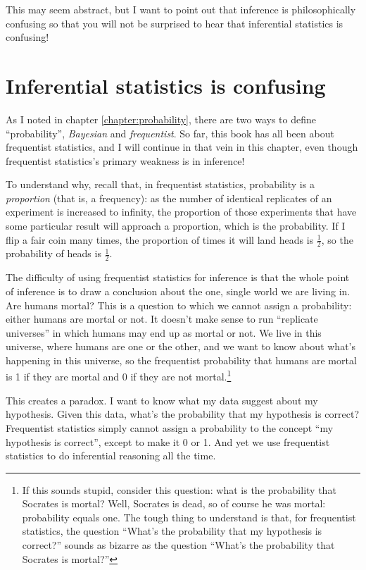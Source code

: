 This may seem abstract, but I want to point out that inference is philosophically confusing so that you will not be surprised to hear that inferential statistics is confusing!

\section{Inferential statistics is confusing}

As I noted in chapter \ref{chapter:probability}, there are two ways to define
``probability'', \emph{Bayesian} and \emph{frequentist}. So far, this book has
all been about frequentist statistics, and I will continue in that vein in this
chapter, even though frequentist statistics's primary weakness is in inference!

To understand why, recall that, in frequentist statistics, probability is
a \emph{proportion} (that is, a frequency): as the number of identical
replicates of an experiment is increased to infinity, the proportion of those
experiments that have some particular result will approach a proportion, which
is the probability. If I flip a fair coin many times, the proportion of times
it will land heads is $\tfrac{1}{2}$, so the probability of heads is
$\tfrac{1}{2}$.

The difficulty of using frequentist statistics for inference is that the whole
point of inference is to draw a conclusion about the one, single world we are
living in. Are humans mortal? This is a question to which we cannot assign
a probability: either humans are mortal or not. It doesn't make sense to run
``replicate universes'' in which humans may end up as mortal or not. We live in
this universe, where humans are one or the other, and we want to know about
what's happening in this universe, so the frequentist probability that humans
are mortal is 1 if they are mortal and 0 if they are not mortal.\footnote{If
this sounds stupid, consider this question: what is the probability that
Socrates is mortal? Well, Socrates is dead, so of course he was mortal:
probability equals one. The tough thing to understand is that, for frequentist
statistics, the question ``What's the probability that my hypothesis is
correct?'' sounds as bizarre as the question ``What's the probability that
Socrates is mortal?''}

This creates a paradox. I want to know what my data suggest about my hypothesis. Given this data, what's the probability that my hypothesis is correct? Frequentist statistics simply cannot assign a probability to the concept ``my hypothesis is correct'', except to make it 0 or 1. And yet we use frequentist statistics to do inferential reasoning all the time.

